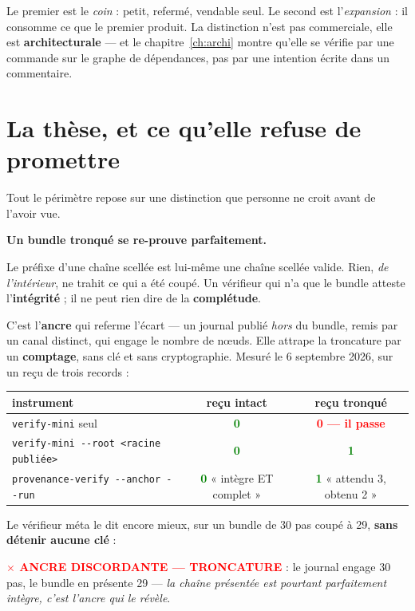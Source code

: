 \documentclass[10pt]{report}
\newcommand{\code}[1]{\texttt{\small #1}}
\newcommand{\ok}[1]{\textcolor{green}{\textbf{#1}}}
\newcommand{\ko}[1]{\textcolor{red}{\textbf{#1}}}
\begin{document}
Le premier est le \emph{coin} : petit, refermé, vendable seul. Le second est l'\emph{expansion} :
il consomme ce que le premier produit. La distinction n'est pas commerciale, elle est
\textbf{architecturale} --- et le chapitre~\ref{ch:archi} montre qu'elle se vérifie par une
commande sur le graphe de dépendances, pas par une intention écrite dans un commentaire.

\section{La thèse, et ce qu'elle refuse de promettre}

Tout le périmètre repose sur une distinction que personne ne croit avant de l'avoir vue.

\begin{alerte}
\textbf{Un bundle tronqué se re-prouve parfaitement.}

Le préfixe d'une chaîne scellée est lui-même une chaîne scellée valide. Rien, \emph{de
l'intérieur}, ne trahit ce qui a été coupé. Un vérifieur qui n'a que le bundle atteste
l'\textbf{intégrité} ; il ne peut rien dire de la \textbf{complétude}.
\end{alerte}

C'est l'\textbf{ancre} qui referme l'écart --- un journal publié \emph{hors} du bundle, remis par un
canal distinct, qui engage le nombre de nœuds. Elle attrape la troncature par un
\textbf{comptage}, sans clé et sans cryptographie. Mesuré le 6 septembre 2026, sur un reçu de trois
records :

\begin{longtable}{@{}p{7.8cm}c c@{}}
\toprule \textbf{instrument} & \textbf{reçu intact} & \textbf{reçu tronqué} \\ \midrule \endhead
\code{verify-mini} seul & \ok{0} & \ko{\textbf{0} --- il passe} \\
\code{verify-mini -{}-root <racine publiée>} & \ok{0} & \ok{1} \\
\code{provenance-verify -{}-anchor -{}-run} & \ok{0} \footnotesize« intègre ET complet » & \ok{1} \footnotesize« attendu 3, obtenu 2 » \\
\bottomrule
\end{longtable}

Le vérifieur méta le dit encore mieux, sur un bundle de 30 pas coupé à 29, \textbf{sans détenir
aucune clé} :

\begin{extrait}
\footnotesize
\ko{$\times$ ANCRE DISCORDANTE --- TRONCATURE} : le journal engage 30 pas, le bundle en présente 29
--- \emph{la chaîne présentée est pourtant parfaitement intègre, c'est l'ancre qui le révèle}.
\end{extrait}
\end{document}
